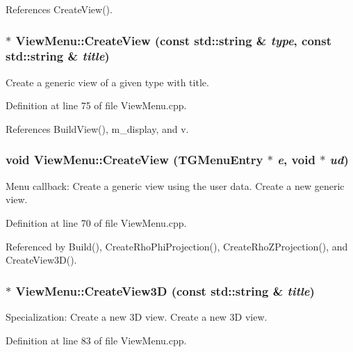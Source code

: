 References CreateView().\hypertarget{class_d_d4hep_1_1_view_menu_a892a83a22a71cfaaed9dca2c8f5a3f67}{
\subsubsection[{CreateView}]{ $\ast$ ViewMenu::CreateView (const std::string \& {\em type}, \/  const std::string \& {\em title})}}
\label{class_d_d4hep_1_1_view_menu_a892a83a22a71cfaaed9dca2c8f5a3f67}


Create a generic view of a given type with title. 

Definition at line 75 of file ViewMenu.cpp.

References BuildView(), m\_\-display, and v.\hypertarget{class_d_d4hep_1_1_view_menu_ad72d3a90a912cf08292c278a45701b93}{
\subsubsection[{CreateView}]{\setlength{\rightskip}{0pt plus 5cm}void ViewMenu::CreateView (TGMenuEntry $\ast$ {\em e}, \/  void $\ast$ {\em ud})}}
\label{class_d_d4hep_1_1_view_menu_ad72d3a90a912cf08292c278a45701b93}


Menu callback: Create a generic view using the user data. Create a new generic view. 

Definition at line 70 of file ViewMenu.cpp.

Referenced by Build(), CreateRhoPhiProjection(), CreateRhoZProjection(), and CreateView3D().\hypertarget{class_d_d4hep_1_1_view_menu_a6fe4cbbcdf7aa56913ae390730d8d12f}{
\subsubsection[{CreateView3D}]{ $\ast$ ViewMenu::CreateView3D (const std::string \& {\em title})}}
\label{class_d_d4hep_1_1_view_menu_a6fe4cbbcdf7aa56913ae390730d8d12f}


Specialization: Create a new 3D view. Create a new 3D view. 

Definition at line 83 of file ViewMenu.cpp.

